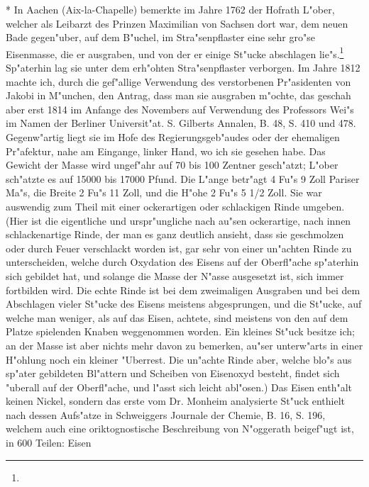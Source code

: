 \documentclass[a4paper, 11pt, oneside, polutonikogreek, german]{article}
\begin{document}
* In Aachen (Aix-la-Chapelle) bemerkte im Jahre 1762 der Hofrath L"ober, welcher als Leibarzt des Prinzen Maximilian von Sachsen dort war, dem neuen Bade gegen"uber, auf dem B"uchel, im Stra"senpflaster eine sehr gro"se Eisenmasse, die er ausgraben, und von der er einige St"ucke abschlagen lie"s.\footnote{} Sp"aterhin lag sie unter dem erh"ohten Stra"senpflaster verborgen. Im Jahre 1812 machte ich, durch die gef"allige Verwendung des verstorbenen Pr"asidenten von Jakobi in M"unchen, den Antrag, dass man sie ausgraben m"ochte, das geschah aber erst 1814 im Anfange des Novembers auf Verwendung des Professors Wei"s im Namen der Berliner Universit"at. S. Gilberts Annalen, B. 48, S. 410 und 478. Gegenw"artig liegt sie im Hofe des Regierungsgeb"audes oder der ehemaligen Pr"afektur, nahe am Eingange, linker Hand, wo ich sie gesehen habe. Das Gewicht der Masse wird ungef"ahr auf 70 bis 100 Zentner gesch"atzt; L"ober sch"atzte es auf 15000 bis 17000 Pfund. Die L"ange betr"agt 4 Fu"s 9 Zoll Pariser Ma"s, die Breite 2 Fu"s 11 Zoll, und die H"ohe 2 Fu"s 5 1/2 Zoll. Sie war auswendig zum Theil mit einer ockerartigen oder schlackigen Rinde umgeben. (Hier ist die eigentliche und urspr"ungliche nach au"sen ockerartige, nach innen schlackenartige Rinde, der man es ganz deutlich ansieht, dass sie geschmolzen oder durch Feuer verschlackt worden ist, gar sehr von einer un"achten Rinde zu unterscheiden, welche durch Oxydation des Eisens auf der Oberfl"ache sp"aterhin sich gebildet hat, und solange die Masse der N"asse ausgesetzt ist, sich immer fortbilden wird. Die echte Rinde ist bei dem zweimaligen Ausgraben und bei dem Abschlagen vieler St"ucke des Eisens meistens abgesprungen, und die St"ucke, auf welche man weniger, als auf das Eisen, achtete, sind meistens von den auf dem Platze spielenden Knaben weggenommen worden. Ein kleines St"uck besitze ich; an der Masse ist aber nichts mehr davon zu bemerken, au"ser unterw"arts in einer H"ohlung noch ein kleiner "Uberrest. Die un"achte Rinde aber, welche blo"s aus sp"ater gebildeten Bl"attern und Scheiben von Eisenoxyd besteht, findet sich "uberall auf der Oberfl"ache, und l"asst sich leicht abl"osen.) Das Eisen enth"alt keinen Nickel, sondern das erste vom Dr. Monheim analysierte St"uck enthielt nach dessen Aufs"atze in Schweiggers Journale der Chemie, B. 16, S. 196, welchem auch eine oriktognostische Beschreibung von N"oggerath beigef"ugt ist, in 600 Teilen: Eisen 
\end{document}

